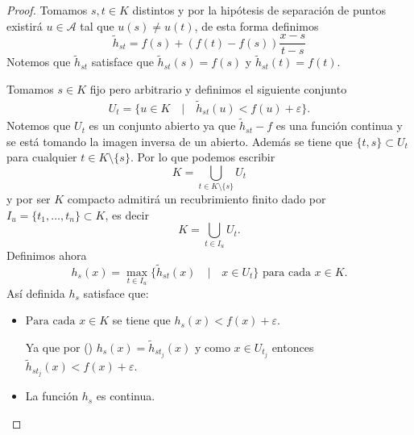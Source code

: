 \begin{proof}
    Tomamos $s,t \in K$ distintos y por la hipótesis de separación de puntos existirá $u \in \mathcal{A}$ tal que $u(s) \neq u(t)$, de esta forma definimos 
    \begin{equation}
        \tilde{h}_{s t} = 
            f(s) + (f(t) - f(s))\frac{ x - s}{ t - s} 
    \end{equation}
    Notemos que  $\tilde{h}_{s t}$ satisface que 
    $\tilde{h}_{s t}(s) = f(s)$ y $\tilde{h}_{s t}(t) = f(t)$. 
    
    Tomamos $s \in K$ fijo pero arbitrario y 
    definimos el siguiente conjunto 
    \begin{align}
        U_t = 
        \{
            u \in K \quad |  \quad
            \tilde{h}_{s t}(u) < f(u) + \varepsilon
        \}.
    \end{align}
    Notemos que $U_t$ es un conjunto abierto ya que 
    $\tilde{h}_{s t} - f$ es una función continua
    y se está tomando la imagen inversa de un abierto. 
    Además se tiene que $\{t,s\} \subset U_t$ para cualquier
    $t \in K \setminus \{s\}$. 
    Por lo que podemos escribir 
    \begin{equation*}
        K = \bigcup_{t \in K \setminus \{s\}} U_t
    \end{equation*}
    y por ser $K$ compacto admitirá un recubrimiento finito dado por 
    $I_u = \{t_1, \ldots, t_n\} \subset K$, es decir 
    \begin{equation}\label{subrecubrimiento_t}
        K = \bigcup_{t \in I_u} U_t.
    \end{equation}
    Definimos ahora 
    \begin{equation*}
        h_s(x) = \max_{t \in I_u}\{ 
            \tilde{h}_{s t}(x) 
            \quad | \quad
            x \in U_t
        \} 
        \text{ para cada } x \in K. 
    \end{equation*}
    Así definida $h_s$ satisface que: 
    \begin{itemize}
        \item $\text{Para cada } x \in K$ se tiene que $h_s(x) < f(x) + \varepsilon$.
        
        Ya que por 
        () 
        $h_s(x) =  \tilde{h}_{s t_j}(x)$ y 
        como $x \in U_{t_j}$ entonces 
        $\tilde{h}_{s t_j}(x) < f(x) + \varepsilon$.
        \item La función $h_s$ es continua.
        

\end{itemize}
\end{proof}
